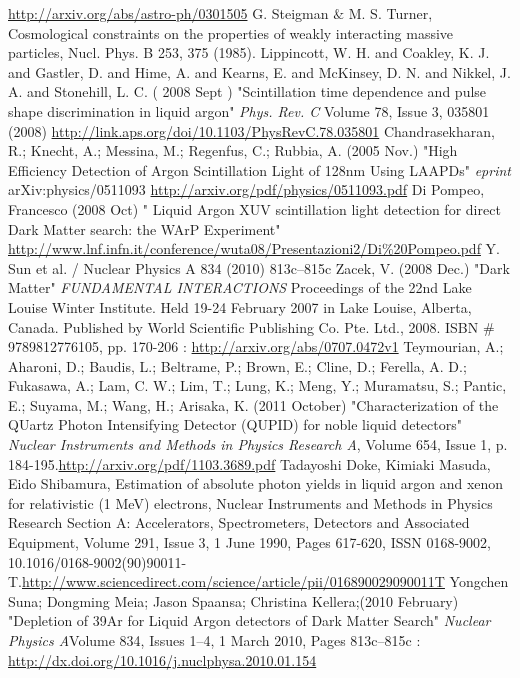 \documentclass[11pt,a4paper,oneside]{report}
\begin{document}
\begin{thebibliography}{9}
 \url{ http://arxiv.org/abs/astro-ph/0301505}
  G. Steigman $\&$ M. S. Turner, Cosmological constraints on the properties of weakly interacting
massive particles, Nucl. Phys. B 253, 375 (1985).
Lippincott, W. H. and Coakley, K. J. and Gastler, D. and Hime, A. and Kearns, E. and McKinsey, D. N. and Nikkel, J. A. and Stonehill, L. C. ( 2008 Sept ) "Scintillation time dependence and pulse shape discrimination in liquid argon" \emph{Phys. Rev. C} Volume 78, Issue 3, 035801 (2008) 
 \url{http://link.aps.org/doi/10.1103/PhysRevC.78.035801}
Chandrasekharan, R.; Knecht, A.; Messina, M.; Regenfus, C.; Rubbia, A. (2005 Nov.) "High Efficiency Detection of Argon Scintillation Light of 128nm Using LAAPDs" \emph{eprint} arXiv:physics/0511093
\url{http://arxiv.org/pdf/physics/0511093.pdf}
Di Pompeo, Francesco (2008 Oct) " Liquid Argon XUV scintillation light detection for direct Dark Matter search: the WArP Experiment" \url{http://www.lnf.infn.it/conference/wuta08/Presentazioni2/Di%20Pompeo.pdf}
 Y. Sun et al. / Nuclear Physics A 834 (2010) 813c–815c
Zacek, V. (2008 Dec.) "Dark Matter" \emph{
FUNDAMENTAL INTERACTIONS} Proceedings of the 22nd Lake Louise Winter Institute. Held 19-24 February 2007 in Lake Louise, Alberta, Canada. Published by World Scientific Publishing Co. Pte. Ltd., 2008. ISBN $\#$9789812776105, pp. 170-206 : \url{http://arxiv.org/abs/0707.0472v1}
Teymourian, A.; Aharoni, D.; Baudis, L.; Beltrame, P.; Brown, E.; Cline, D.; Ferella, A. D.; Fukasawa, A.; Lam, C. W.; Lim, T.; Lung, K.; Meng, Y.; Muramatsu, S.; Pantic, E.; Suyama, M.; Wang, H.; Arisaka, K. (2011 October) "Characterization of the QUartz Photon Intensifying Detector (QUPID) for noble liquid detectors" \emph{Nuclear Instruments and Methods in Physics Research A}, Volume 654, Issue 1, p. 184-195.\url{http://arxiv.org/pdf/1103.3689.pdf}
Tadayoshi Doke, Kimiaki Masuda, Eido Shibamura, Estimation of absolute photon yields in liquid argon and xenon for relativistic (1 MeV) electrons, Nuclear Instruments and Methods in Physics Research Section A: Accelerators, Spectrometers, Detectors and Associated Equipment, Volume 291, Issue 3, 1 June 1990, Pages 617-620, ISSN 0168-9002, 10.1016/0168-9002(90)90011-T.\url{http://www.sciencedirect.com/science/article/pii/016890029090011T}
Yongchen Suna; Dongming Meia; Jason Spaansa; Christina Kellera;(2010 February) "Depletion of 39Ar for Liquid Argon detectors of Dark Matter Search" \emph{Nuclear Physics A}Volume 834, Issues 1–4, 1 March 2010, Pages 813c–815c : \url{http://dx.doi.org/10.1016/j.nuclphysa.2010.01.154}

\end{thebibliography}
\end{document}
